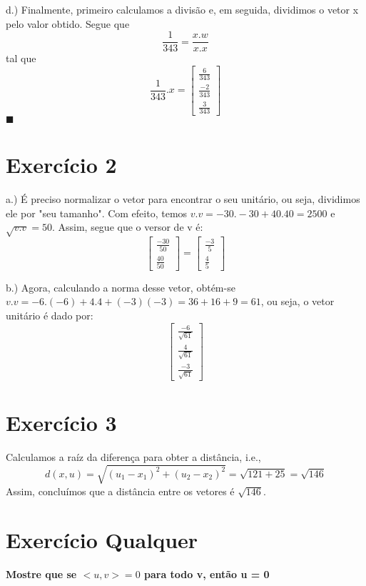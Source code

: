 \documentclass{article}
\renewcommand\qedsymbol{$\blacksquare$}
\begin{document}
d.) Finalmente, primeiro calculamos a divis\~ao e, em seguida, dividimos o vetor x pelo valor obtido.
Segue que
$$
	\frac{1}{343} = \frac{x.w}{x.x}
$$
tal que
$$
	\frac{1}{343}.x = \begin{bmatrix}
		\frac{6}{343}  \\
		\frac{-2}{343} \\
		\frac{3}{343}
	\end{bmatrix}
$$ \qedsymbol

\section*{Exerc\'icio 2}

a.) \'E preciso normalizar o vetor para encontrar o seu unit\'ario, ou seja, dividimos ele por "seu tamanho". Com
efeito, temos $v.v = -30.-30 + 40.40 = 2500$ e $\sqrt{v.v} = 50$. Assim, segue que o versor de v \'e:
$$
	\begin{bmatrix}
		\frac{-30}{50} \\
		\frac{40}{50}
	\end{bmatrix} =
	\begin{bmatrix}
		\frac{-3}{5} \\
		\frac{4}{5}
	\end{bmatrix}
$$

b.) Agora, calculando a norma desse vetor, obt\'em-se $v.v = -6.(-6) + 4.4 + (-3)(-3) = 36 + 16 + 9 = 61$, ou seja,
o vetor unit\'ario \'e dado por:
$$
	\begin{bmatrix}
		\frac{-6}{\sqrt{61}} \\
		\frac{4}{\sqrt{61}}  \\
		\frac{-3}{\sqrt{61}}
	\end{bmatrix}
$$

\section*{Exerc\'icio 3}

Calculamos a ra\'iz da diferen\c ca para obter a dist\^ancia, i.e.,
$$
	d(x, u) = \sqrt{(u_1 - x_1)^2 + (u_2 - x_2)^2} = \sqrt{121 + 25} = \sqrt{146}
$$
Assim, conclu\'imos que a dist\^ancia entre os vetores \'e $\sqrt{146}$.

\section*{Exerc\'icio Qualquer}

\textbf{Mostre que se $<u, v> = 0$ para todo v, ent\~ao u = 0}
\end{document}
